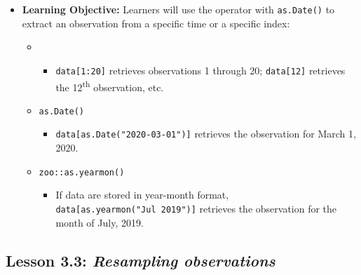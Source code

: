 \documentclass[
]{book}
\providecommand{\tightlist}{%
  \setlength{\itemsep}{0pt}\setlength{\parskip}{0pt}}
\begin{document}
\begin{itemize}
\tightlist
\item
  \textbf{Learning Objective:} Learners will use the \texttt{\textquotesingle{}{[}\textquotesingle{}} operator with \texttt{as.Date()} to extract an observation from a specific time or a specific index:

  \begin{itemize}
  \tightlist
  \item
    \texttt{\textquotesingle{}{[}\textquotesingle{}}

    \begin{itemize}
    \tightlist
    \item
      \texttt{data{[}1:20{]}} retrieves observations 1 through 20; \texttt{data{[}12{]}} retrieves the 12\textsuperscript{th} observation, etc.
    \end{itemize}
  \item
    \texttt{as.Date()}

    \begin{itemize}
    \tightlist
    \item
      \texttt{data{[}as.Date("2020-03-01"){]}} retrieves the observation for March 1, 2020.
    \end{itemize}
  \item
    \texttt{zoo::as.yearmon()}

    \begin{itemize}
    \tightlist
    \item
      If data are stored in year-month format, \texttt{data{[}as.yearmon("Jul\ 2019"){]}} retrieves the observation for the month of July, 2019.
    \end{itemize}
  \end{itemize}
\end{itemize}

\hypertarget{lesson-3.3-resampling-observations}{%
\subsection*{\texorpdfstring{Lesson 3.3: \emph{Resampling observations}}{Lesson 3.3: Resampling observations}}\label{lesson-3.3-resampling-observations}}
\end{document}
